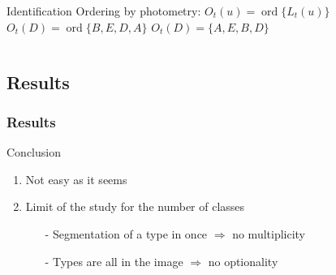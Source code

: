 \begin{frame}
\begin{columns}[c]

				\column{15em}	
				\begin{alertblock}{Identification}
				Ordering by photometry: %
				$O_t(u) = \operatorname{ord} \{ L_t(u) \}$
				$O_t(D) = \operatorname{ord} \{ B,E,D,A \}$
				$O_t(D) = \{ A, E, B, D \}$
				
				\end{alertblock}					
			\end{columns}


		\end{frame}
		


	\subsection[Results]{Results}
		\begin{frame}
			\frametitle{Results}
			\begin{block}{Conclusion}
				\begin{enumerate}
					\item Not easy as it seems
					\item Limit of the study for the number of classes
					\begin{enumerate}
						\item[-] Segmentation of a type in once $\Rightarrow$ no multiplicity
						\item[-] Types are all in the image $\Rightarrow$ no optionality
					\end{enumerate}

				\end{enumerate}
			\end{block}			
		\end{frame}
		


		



